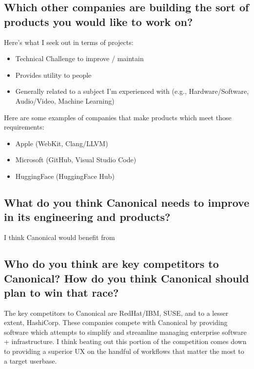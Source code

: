 \documentclass{article}
\begin{document}
\subsection{Which other companies are building the sort of products you would
    like to work on?}
Here's what I seek out in terms of projects:
\begin{itemize}
    \item Technical Challenge to improve / maintain
    \item Provides utility to people
    \item Generally related to a subject I'm experienced with (e.g., Hardware/Software, Audio/Video, Machine Learning)
\end{itemize}
Here are some examples of companies that make products which meet those
requirements:
\begin{itemize}
    \item Apple (WebKit, Clang/LLVM)
    \item Microsoft (GitHub, Visual Studio Code)
    \item HuggingFace (HuggingFace Hub)
\end{itemize} \subsection{What do you think Canonical needs to improve in its
    engineering and products?}

I think Canonical would benefit from

\subsection{Who do you think are key competitors to Canonical? How do you think
    Canonical should plan to win that race?}

The key competitors to Canonical are RedHat/IBM, SUSE, and to a lesser extent,
HashiCorp. These companies compete with Canonical by providing software which
attempts to simplify and streamline managing enterprise software +
infrastructure. I think beating out this portion of the competition comes down
to providing a superior UX on the handful of workflows that matter the most to a
target userbase.




\end{document}
